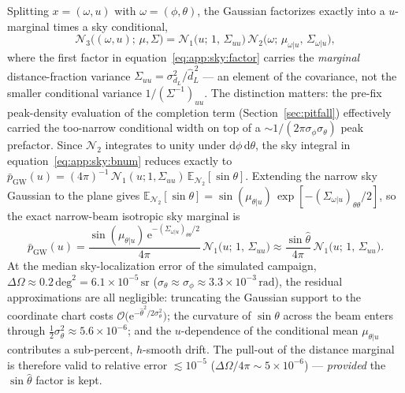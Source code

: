 Splitting $x = (\omega, u)$ with $\omega = (\phi,\theta)$, the Gaussian
factorizes exactly into a $u$-marginal times a sky conditional,
\begin{equation}
  \mathcal{N}_3\big((\omega,u);\,\mu,\Sigma\big)
  = \mathcal{N}_1\big(u;\,1,\,\Sigma_{uu}\big)\,
    \mathcal{N}_2\big(\omega;\,\mu_{\omega|u},\,\Sigma_{\omega|u}\big),
  \label{eq:app:sky:factor}
\end{equation}
where the first factor in equation~\eqref{eq:app:sky:factor} carries the
\emph{marginal} distance-fraction variance
$\Sigma_{uu} = \sigma_{d_L}^2/\hat d_L^{\,2}$ --- an element of the covariance,
not the smaller conditional variance $1/(\Sigma^{-1})_{uu}$. The distinction
matters: the pre-fix peak-density evaluation of the completion term
(Section~\ref{sec:pitfall}) effectively carried the too-narrow conditional
width on top of a $\sim 1/(2\pi\sigma_\phi\sigma_\theta)$ peak prefactor.
Since $\mathcal{N}_2$ integrates to unity under
$\mathrm{d}\phi\,\mathrm{d}\theta$, the sky integral in
equation~\eqref{eq:app:sky:bnum} reduces exactly to
$\bar p_\mathrm{GW}(u) = (4\pi)^{-1}\,\mathcal{N}_1(u;1,\Sigma_{uu})\,
\mathbb{E}_{\mathcal{N}_2}[\sin\theta]$. Extending the narrow sky Gaussian to
the plane gives
$\mathbb{E}_{\mathcal{N}_2}[\sin\theta] = \sin(\mu_{\theta|u})\,
\exp[-(\Sigma_{\omega|u})_{\theta\theta}/2]$, so the exact narrow-beam
isotropic sky marginal is
\begin{equation}
  \bar p_\mathrm{GW}(u)
  = \frac{\sin(\mu_{\theta|u})\,
    \mathrm{e}^{-(\Sigma_{\omega|u})_{\theta\theta}/2}}{4\pi}\,
    \mathcal{N}_1\big(u;\,1,\,\Sigma_{uu}\big)
  \approx \frac{\sin\hat\theta}{4\pi}\,
    \mathcal{N}_1\big(u;\,1,\,\Sigma_{uu}\big).
  \label{eq:app:sky:marginal}
\end{equation}
At the median sky-localization error of the simulated campaign,
$\Delta\Omega \approx 0.2\,\mathrm{deg}^2 = 6.1\times10^{-5}\,\mathrm{sr}$
($\sigma_\theta \approx \sigma_\phi \approx 3.3\times10^{-3}\,\mathrm{rad}$), %
the residual approximations are all negligible: truncating the Gaussian
support to the coordinate chart costs
$\mathcal{O}\big(\mathrm{e}^{-\hat\theta^2/2\sigma_\theta^2}\big)$; the
curvature of $\sin\theta$ across the beam enters through
$\tfrac12\sigma_\theta^2 \approx 5.6\times10^{-6}$; and the $u$-dependence of %
the conditional mean $\mu_{\theta|u}$ contributes a sub-percent, $h$-smooth
drift. The pull-out of the distance marginal is therefore valid to relative
error $\lesssim 10^{-5}$ ($\Delta\Omega/4\pi \sim 5\times10^{-6}$) --- %
\emph{provided} the $\sin\hat\theta$ factor is kept.

